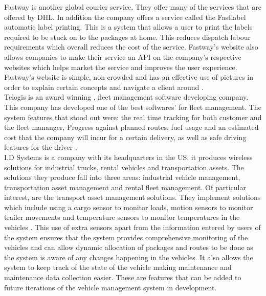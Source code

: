 \documentclass[paper=a4, fontsize=11pt]{scrartcl} %
\numberwithin{equation}{section} %
\numberwithin{figure}{section} %
\numberwithin{table}{section} %
\begin{document}
Fastway is another global courier service. They offer many of the services that are offered by DHL. In addition the company offers a service called the Fastlabel automatic label printing. This is a system that allows a user to print the labels required to be stuck on to the packages at home. This reduces dispatch labour requirements which overall reduces the cost of the service. Fastway's website also allows companies to make their service an API on the company's respective websites which helps market the service and improves the user experience. Fastway's website is simple, non-crowded and has an effective use of pictures in order to explain certain concepts and navigate a client around \cite{Fastway}.
\\

Telogis is an award winning , fleet management software developing company. This company has developed one of the best softwares' for  fleet management. The system features that stood out were: the real time tracking for both customer and the fleet mananger, Progress against planned routes, fuel usage and an estimated cost that the company will incur for a certain delivery, as well as safe driving features for the driver \cite{Telogis}.
\\


I.D Systems is a company with its headquarters in the US, it produces wireless solutions for industrial trucks, rental vehicles and transportation assets. The solutions they produce fall into three areas: industrial vehicle management, transportation asset management and rental fleet management. Of particular interest, are the transport asset management solutions. They implement solutions which include using a cargo sensor to monitor loads, motion sensors to monitor trailer movements and temperature sensors to monitor temperatures in the vehicles \cite{IDSystems}. This use of extra sensors apart from the information entered by users of the system ensures that the system provides comprehensive monitoring of the vehicles and can allow dynamic allocation of packages and routes to be done as the system is aware of any changes happening in the vehicles. It also allows the system to keep track of the state of the vehicle making maintenance and maintenance data collection easier. These are features that can be added to future iterations of the vehicle management system in development.
\\
\end{document}
